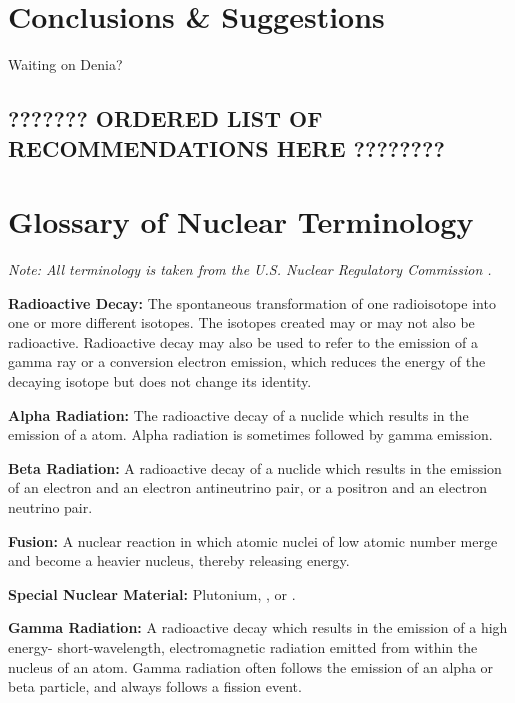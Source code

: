 \documentclass{report}
\begin{document}
\chapter{Conclusions \& Suggestions}

Waiting on Denia?

\section{??????? ORDERED LIST OF RECOMMENDATIONS HERE ????????}






\appendix
\chapter[Appendix A: Glossary of Nuclear Terminology]{Glossary of Nuclear Terminology}  \label{app:glossary}



\textit{Note: All terminology is taken from the U.S. Nuclear Regulatory Commission  \cite{USNRC2015}.}

\textbf{Radioactive Decay:} The spontaneous transformation of one radioisotope into one or more different isotopes. The isotopes created may or may not also be radioactive. Radioactive decay may also be used to refer to the emission of a gamma ray or a conversion electron emission, which reduces the energy of the decaying isotope but does not change its identity. 

\textbf{Alpha Radiation:} The radioactive decay of a nuclide which results in the emission of a  atom. Alpha radiation is sometimes followed by gamma emission. 

\textbf{Beta Radiation:} A radioactive decay of a nuclide which results in the emission of an electron and an electron antineutrino pair, or a positron and an electron neutrino pair. 

\textbf{Fusion:} A nuclear reaction in which atomic nuclei of low atomic number merge and become a heavier nucleus, thereby releasing energy. 

\textbf{Special Nuclear Material:} Plutonium, ,  or .

\textbf{Gamma Radiation:} A radioactive decay which results in the emission of a high energy- short-wavelength, electromagnetic radiation emitted from within the nucleus of an atom. Gamma radiation often follows the emission of an alpha or beta particle, and always follows a fission event. 
\end{document}
